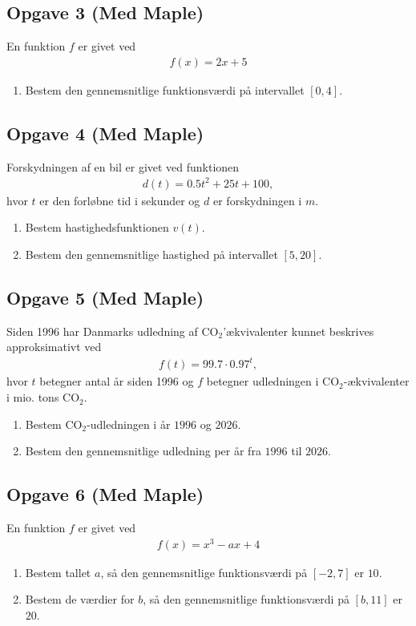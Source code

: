 \subsection*{Opgave 3 (Med Maple)}
En funktion $f$ er givet ved
\begin{align*}
	f(x) = 2x + 5
\end{align*}
\begin{enumerate}[label=\roman*)]
	\item Bestem den gennemsnitlige funktionsværdi på intervallet $[0,4]$. 
\end{enumerate}

\subsection*{Opgave 4 (Med Maple)}
Forskydningen af en bil er givet ved funktionen
\begin{align*}
	d(t) = 0.5t^2 + 25t + 100,
\end{align*}
hvor $t$ er den forløbne tid i sekunder og $d$ er forskydningen i $m$.
\begin{enumerate}[label=\roman*)]
	\item Bestem hastighedsfunktionen $v(t)$.
	\item Bestem den gennemsnitlige hastighed på intervallet $[5,20]$. 
\end{enumerate}

\subsection*{Opgave 5 (Med Maple)}
Siden 1996 har Danmarks udledning af CO$_2$'ækvivalenter kunnet beskrives approksimativt ved
\begin{align*}
	f(t) = 99.7\cdot 0.97^t,
\end{align*}
hvor $t$ betegner antal år siden 1996 og $f$ betegner udledningen i CO$_2$-ækvivalenter i mio. tons CO$_2$.
\begin{enumerate}[label=\roman*)]
	\item Bestem CO$_2$-udledningen i år $1996$ og $2026$.
	\item Bestem den gennemsnitlige udledning per år fra $1996$ til $2026$. 
\end{enumerate}

\subsection*{Opgave 6 (Med Maple)}
En funktion $f$ er givet ved
\begin{align*}
	f(x) = x^3 - ax + 4
\end{align*}
\begin{enumerate}[label=\roman*)]
	\item Bestem tallet $a$, så den gennemsnitlige funktionsværdi på $[-2,7]$ er $10$.
	\item Bestem de værdier for $b$, så den gennemsnitlige funktionsværdi på $[b,11]$ er $20$.
\end{enumerate}

